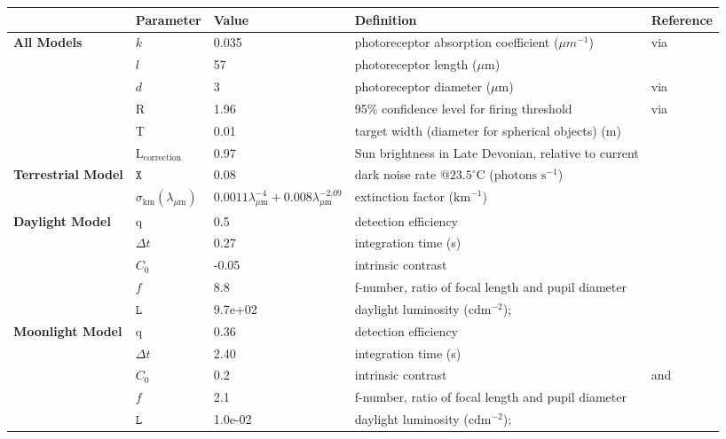 \begin{tabular}{|L{3.5cm}|L{2cm}|L{2cm}|L{4.5cm}|L{4.5cm}|}
\hline
\textbf{ }&\textbf{Parameter}&\textbf{Value}&\textbf{Definition}&\textbf{Reference}\\\hline
\textbf{All Models}&$k$&0.035&photoreceptor absorption coefficient ($\mu m^{-1}$)&\cite{Part90a} via \cite{Warr98a}\\\hline
 &$l$&57&photoreceptor length ($\mu \text{m}$)&\cite{Nils14a}\\\hline
 &$d$&3&photoreceptor diameter ($\mu \text{m}$)&\cite{Land12a} via \cite{Nils14a}\\\hline
 &R&1.96&95\% confidence level for firing threshold&\cite{Land81a} via \cite{Nils14a}\\\hline
 &T&0.01&target width (diameter for spherical objects) (m)& \\\hline
 &$\text{L}_{\text{correction}}$&0.97&Sun brightness in Late Devonian, relative to current&\cite{Bahc01a}\\\hline
\textbf{Terrestrial Model}&$\mathtt{X}$&0.08&dark noise rate @$23.5^{\circ} \text{C}$ ($\text{photons } \text{s}^{-1}$)&\cite{Aho93a}\\\hline
 &$\sigma_{\text{km}} (\lambda_{\mu \text{m}})$&$0.0011 \lambda_{\mu \text{m}}^{-4} + 0.008 \lambda_{\mu \text{m}}^{-2.09}$&extinction factor ($\text{km}^{-1}$)&\cite{Midd52a}\\\hline
\textbf{Daylight Model}&q&0.5&detection efficiency&\cite{Pirh07a}\\\hline
 &$\Delta t$&0.27&integration time (s)&\cite{Donn95a}\\\hline
 &$C_{0}$&-0.05&intrinsic contrast&\cite{Blac46a}\\\hline
 &$f$&8.8&f-number, ratio of focal length and pupil diameter&\cite{Mill79a}\\\hline
 &$\mathtt{L}$&9.7e+02&daylight luminosity ($\text{cd} \text{m}^{-2}$);&\cite{Midd52a}\\\hline
\textbf{Moonlight Model}&q&0.36&detection efficiency&\cite{Nils14a}\\\hline
 &$\Delta t$&2.40&integration time (s)&\cite{Donn95a}\\\hline
 &$C_{0}$&0.2&intrinsic contrast&\cite{Hest68a} and \cite{Blac46a}\\\hline
 &$f$&2.1&f-number, ratio of focal length and pupil diameter&\cite{Mill79a}\\\hline
 &$\mathtt{L}$&1.0e-02&daylight luminosity ($\text{cd} \text{m}^{-2}$);&\cite{Midd52a}\\\hline

\end{tabular}
